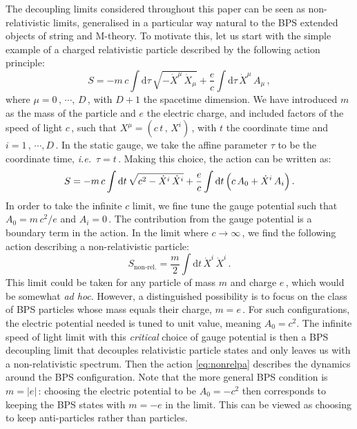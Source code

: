 \documentclass[11pt]{article}
\newcommand{\be}{\begin{equation}}
\newcommand{\ee}{\end{equation}}
\renewcommand{\emph}[1]{\textit{#1}}
\newcommand{\dd}{\mathrm{d}}
\begin{document}
The decoupling limits considered throughout this paper can be seen as non-relativistic limits, generalised in a particular way natural to the BPS extended objects of string and M-theory.
To motivate this, let us start with the simple example 
of a charged relativistic particle described by the following action principle:
%
\be \label{eq:pa}
    S = - m \, c \int \dd\tau \, \sqrt{- \dot{X}^\mu_{\phantom{\dagger}} \, \dot{X}_\mu} + \frac{e}{c} \int \dd\tau \, \dot{X}^\mu \, A_\mu\,,
\ee
%
where $\mu = 0\,, \, \cdots, \, D$\,, with $D+1$ the spacetime dimension. We have introduced $m$ as the mass of the particle and $e$ the electric charge, and included factors of the speed of light $c$\,, such that  $X^\mu = (c \, t\,, \, X^i)$\,, with $t$ the coordinate time and $i = 1\,, \, \cdots, D$\,. 
In the static gauge, we take the affine parameter $\tau$ to be the coordinate time, \emph{i.e.}~$\tau = t$\,. 
Making this choice, the action can be written as:
%
\be
    S = - m \, c \int \dd t \, \sqrt{c^2 - \dot{X}^i \, \dot{X}^i} + \frac{e}{c} \int \dd t \, \Bigl( c \, A_0 + \dot{X}^i \, A_i \Bigr)\,.
\ee
%
In order to take the infinite $c$ limit, we fine tune the gauge potential such that
%
$A_0 = m \, c^2 / e$ and $A_i = 0$\,. 
% 
The contribution from the gauge potential is a boundary term in the action. 
In the limit where $c \rightarrow \infty$\,, we find the following action describing a non-relativistic particle:
%
\be \label{eq:nonrelpa}
    S_\text{non-rel.} = \frac{m}{2} \int \dd t \, \dot{X}^i \, \dot{X}^i\,. 
\ee
%
This limit could be taken for any particle of mass $m$ and charge $e$\,, which would be somewhat \emph{ad hoc}. 
However, a distinguished possibility is to focus on the class of BPS particles whose mass equals their charge, $m=e$\,. 
For such configurations, the electric potential needed is tuned to unit value, meaning $A_0=c^2$.
The infinite speed of light limit with this \emph{critical} choice of gauge potential is then a BPS decoupling limit that decouples relativistic particle states and only leaves us with a non-relativistic spectrum.
Then the action \eqref{eq:nonrelpa} describes the dynamics around the BPS configuration. 
Note that the more general BPS condition is $m=|e|$\,: choosing the electric potential to be $A_0 = -c^2$ then corresponds to keeping the BPS states with $m=-e$ in the limit. This can be viewed as choosing to keep anti-particles rather than particles.
\end{document}
